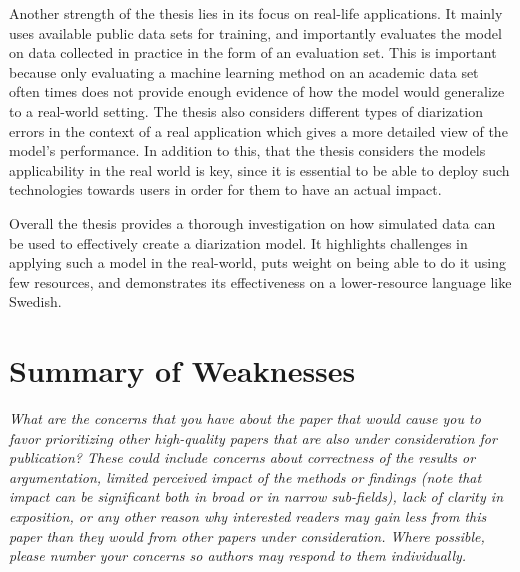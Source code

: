 \documentclass{article}
\begin{document}
Another strength of the thesis lies in its focus on real-life applications. It mainly uses available public data sets for training, and importantly evaluates the model on data collected in practice in the form of an evaluation set. This is important because only evaluating a machine learning method on an academic data set often times does not provide enough evidence of how the model would generalize to a real-world setting. The thesis also considers different types of diarization errors in the context of a real application which gives a more detailed view of the model's performance. In addition to this, that the thesis considers the models applicability in the real world is key, since it is essential to be able to deploy such technologies towards users in order for them to have an actual impact.

Overall the thesis provides a thorough investigation on how simulated data can be used to effectively create a diarization model. It highlights challenges in applying such a model in the real-world, puts weight on being able to do it using few resources, and demonstrates its effectiveness on a lower-resource language like Swedish.








\section{Summary of Weaknesses}

\textit{What are the concerns that you have about the paper that would cause you to favor prioritizing other high-quality papers that are also under consideration for publication? These could include concerns about correctness of the results or argumentation, limited perceived impact of the methods or findings (note that impact can be significant both in broad or in narrow sub-fields), lack of clarity in exposition, or any other reason why interested readers may gain less from this paper than they would from other papers under consideration. Where possible, please number your concerns so authors may respond to them individually.}
\end{document}

